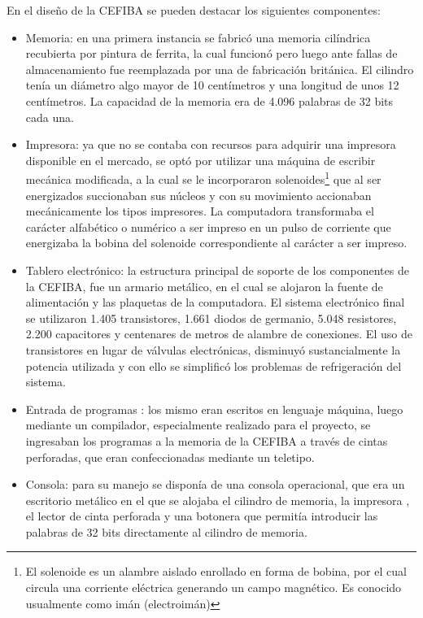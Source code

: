 \documentclass[%
 	final,
%
	notitlepage,
	narroweqnarray,
	inline,
 	twoside,
	]{ieee}
\begin{document}
En el dise\~no de la CEFIBA se pueden destacar los siguientes componentes:\\
\begin{itemize}
\item  Memoria: en una primera instancia se fabric\'o una memoria cil\'indrica recubierta por pintura de ferrita, la cual funcion\'o pero luego ante fallas de almacenamiento fue reemplazada por una de fabricaci\'on brit\'anica. El cilindro ten\'ia un di\'ametro algo mayor de 10 cent\'imetros y una longitud de unos 12 cent\'imetros. La capacidad de la memoria era de 4.096 palabras de 32 bits cada una.\\

\item Impresora: ya que no se contaba con recursos para adquirir una impresora disponible en el mercado, se opt\'o por utilizar una m\'aquina de escribir mec\'anica modificada, a la cual se le incorporaron solenoides\footnote{El solenoide es un alambre aislado enrollado en forma de bobina, por el cual circula una corriente el\'ectrica generando un campo magn\'etico. Es conocido usualmente como im\'an (electroim\'an)} que al ser energizados succionaban sus n\'ucleos y con su movimiento accionaban mec\'anicamente los tipos impresores. La computadora transformaba el car\'acter alfab\'etico o num\'erico a ser impreso en un pulso de corriente que energizaba la bobina del solenoide correspondiente al car\'acter a ser impreso.\\

\item Tablero electr\'onico: la estructura principal de soporte de los componentes de la CEFIBA, fue un armario met\'alico, en el cual se alojaron la fuente de alimentaci\'on y las plaquetas de la computadora. El sistema electr\'onico final se utilizaron 1.405 transistores, 1.661 diodos de germanio, 5.048 resistores, 2.200 capacitores y centenares de metros de alambre de conexiones. El uso de transistores en lugar de v\'alvulas electr\'onicas, disminuy\'o sustancialmente la potencia utilizada y con ello se simplific\'o los problemas de refrigeraci\'on del sistema.\\

\item Entrada de programas : los mismo eran escritos en lenguaje m\'aquina, luego mediante un compilador, especialmente realizado para el proyecto, se ingresaban los programas a la memoria de la CEFIBA a trav\'es de cintas perforadas, que eran confeccionadas mediante un teletipo.\\

\item Consola: para su manejo se dispon\'ia de una consola operacional, que era un escritorio met\'alico en el que se alojaba el cilindro de memoria, la impresora , el lector de cinta perforada y una botonera que permit\'ia introducir las palabras de 32 bits directamente al cilindro de memoria.\\
\end{itemize}
\end{document}

